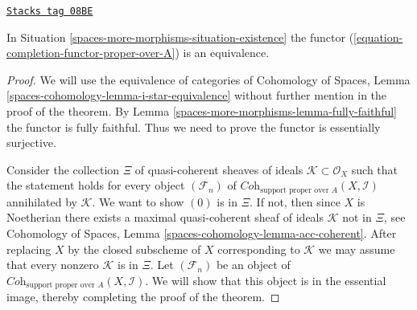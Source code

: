 \begin{theorem}

\label{spaces-more-morphisms-theorem-grothendieck-existence}
\href{https://stacks.math.columbia.edu/tag/08BE}{\texttt{Stacks tag 08BE}}

In Situation \ref{spaces-more-morphisms-situation-existence} the functor
(\ref{equation-completion-functor-proper-over-A})
is an equivalence.
\end{theorem}

\begin{proof}
We will use the equivalence of categories of
Cohomology of Spaces, Lemma \ref{spaces-cohomology-lemma-i-star-equivalence}
without further mention in the proof of the theorem.
By Lemma \ref{spaces-more-morphisms-lemma-fully-faithful} the functor is fully faithful.
Thus we need to prove the functor is essentially surjective.

\medskip\noindent
Consider the collection $\Xi$ of quasi-coherent sheaves of ideals
$\mathcal{K} \subset \mathcal{O}_X$ such that the statement holds
for every object $(\mathcal{F}_n)$ of
$\textit{Coh}_{\text{support proper over }A}(X, \mathcal{I})$
annihilated by $\mathcal{K}$. We want to show $(0)$ is in $\Xi$.
If not, then since $X$ is Noetherian there exists a maximal
quasi-coherent sheaf of ideals $\mathcal{K}$ not in $\Xi$, see
Cohomology of Spaces, Lemma \ref{spaces-cohomology-lemma-acc-coherent}.
After replacing $X$ by the closed subscheme of $X$
corresponding to $\mathcal{K}$ we may assume that every nonzero
$\mathcal{K}$ is in $\Xi$. Let $(\mathcal{F}_n)$ be an object of
$\textit{Coh}_{\text{support proper over }A}(X, \mathcal{I})$.
We will show that this object is in the essential image, thereby
completing the proof of the theorem.


\end{proof}
